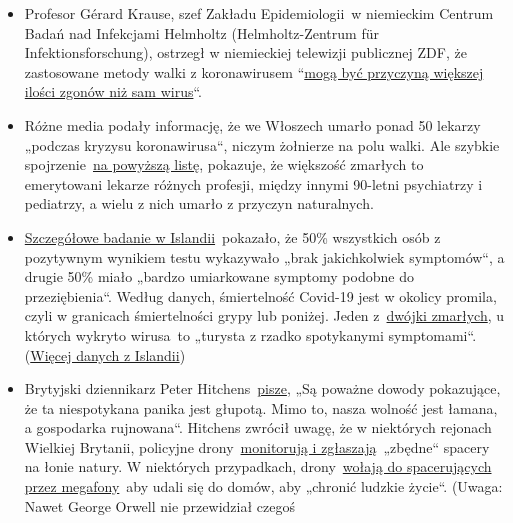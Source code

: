 \begin{itemize}
\tightlist
\item
  Profesor Gérard Krause, szef Zakładu Epidemiologii~w niemieckim
  Centrum Badań nad Infekcjami Helmholtz (Helmholtz-Zentrum für
  Infektionsforschung), ostrzegł w niemieckiej telewizji publicznej ZDF,
  że zastosowane metody walki z koronawirusem
  ``\href{https://www.zdf.de/nachrichten/politik/coronavirus-epidemiologe-folgen-helmholtz-100.html}{mogą
  być przyczyną większej ilości zgonów niż sam wirus}``.
\item
  Różne media podały informację, że we Włoszech umarło ponad 50 lekarzy
  „podczas kryzysu koronawirusa``, niczym żołnierze na polu walki. Ale
  szybkie
  spojrzenie~\href{https://web.archive.org/web/20200328152430/https://portale.fnomceo.it/elenco-dei-medici-caduti-nel-corso-dellepidemia-di-covid-19/}{na
  powyższą listę}, pokazuje, że większość zmarłych to emerytowani
  lekarze różnych profesji, między innymi 90-letni psychiatrzy i
  pediatrzy, a wielu z nich umarło z przyczyn naturalnych.
\item
  \href{https://www.buzzfeed.com/albertonardelli/coronavirus-testing-iceland}{Szczegółowe
  badanie w Islandii}~pokazało, że 50\% wszystkich osób z pozytywnym
  wynikiem testu wykazywało „brak jakichkolwiek symptomów``, a drugie
  50\% miało „bardzo umiarkowane symptomy podobne do przeziębienia``.
  Według danych, śmiertelność Covid-19 jest w okolicy promila, czyli w
  granicach śmiertelności grypy lub poniżej. Jeden
  z~\href{https://www.government.is/news/article/?newsid=c65cf658-6eb6-11ea-9462-005056bc4d74}{dwójki
  zmarłych}, u których wykryto wirusa~to „turysta z rzadko spotykanymi
  symptomami``. (\href{https://www.covid.is/data}{Więcej danych z
  Islandii})
\item
  Brytyjski dziennikarz Peter
  Hitchens~\href{https://hitchensblog.mailonsunday.co.uk/2020/03/theres-powerful-evidence-this-great-panic-is-foolish-yet-our-freedom-is-still-broken-and-our-economy.html}{pisze},
  „Są poważne dowody pokazujące, że ta niespotykana panika jest głupotą.
  Mimo to, nasza wolność jest łamana, a gospodarka rujnowana``. Hitchens
  zwrócił uwagę, że w niektórych rejonach Wielkiej Brytanii, policyjne
  drony~\href{https://www.youtube.com/watch?v=fHNxDzLsPeg}{monitorują i
  zgłaszają}~„zbędne`` spacery na łonie natury. W niektórych
  przypadkach,
  drony~\href{https://www.youtube.com/watch?v=D4GEZjUTkqc}{wołają do
  spacerujących przez megafony}~aby udali się do domów, aby „chronić
  ludzkie życie``. (Uwaga: Nawet George Orwell nie przewidział czegoś

\end{itemize}
